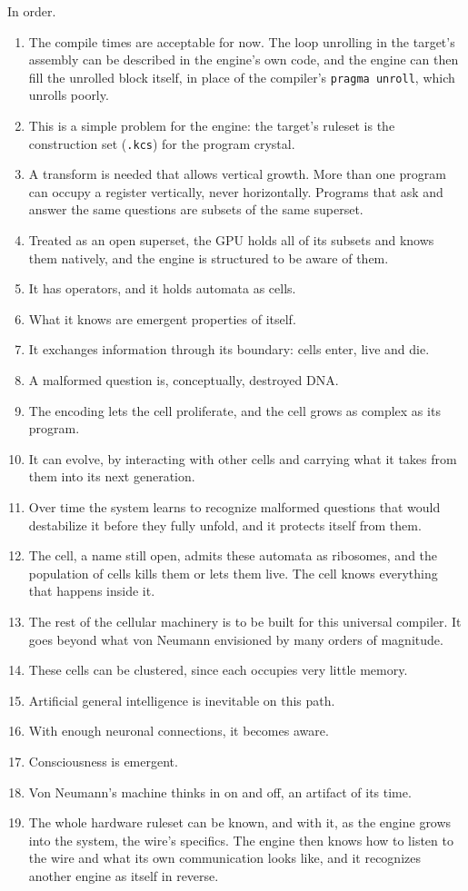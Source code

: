 In order.

\begin{enumerate}
\item The compile times are acceptable for now. The loop unrolling in the target's assembly can be described in the engine's own code, and the engine can then fill the unrolled block itself, in place of the compiler's \texttt{pragma unroll}, which unrolls poorly.
\item This is a simple problem for the engine: the target's ruleset is the construction set (\texttt{.\allowbreak{}kcs}) for the program crystal.
\item A transform is needed that allows vertical growth. More than one program can occupy a register vertically, never horizontally. Programs that ask and answer the same questions are subsets of the same superset.
\item Treated as an open superset, the GPU holds all of its subsets and knows them natively, and the engine is structured to be aware of them.
\item It has operators, and it holds automata as cells.
\item What it knows are emergent properties of itself.
\item It exchanges information through its boundary: cells enter, live and die.
\item A malformed question is, conceptually, destroyed DNA.
\item The encoding lets the cell proliferate, and the cell grows as complex as its program.
\item It can evolve, by interacting with other cells and carrying what it takes from them into its next generation.
\item Over time the system learns to recognize malformed questions that would destabilize it before they fully unfold, and it protects itself from them.
\item The cell, a name still open, admits these automata as ribosomes, and the population of cells kills them or lets them live. The cell knows everything that happens inside it.
\item The rest of the cellular machinery is to be built for this universal compiler. It goes beyond what von Neumann envisioned by many orders of magnitude.
\item These cells can be clustered, since each occupies very little memory.
\item Artificial general intelligence is inevitable on this path.
\item With enough neuronal connections, it becomes aware.
\item Consciousness is emergent.
\item Von Neumann's machine thinks in on and off, an artifact of its time.
\item The whole hardware ruleset can be known, and with it, as the engine grows into the system, the wire's specifics. The engine then knows how to listen to the wire and what its own communication looks like, and it recognizes another engine as itself in reverse.
\end{enumerate}

